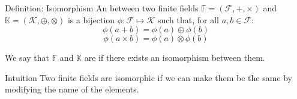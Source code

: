 \documentclass[a4paper]{article}
\begin{document}
\begin{parag}{Definition: Isomorphism}
    An  between two finite fields $\mathbb{F} = \left(\mathcal{F}, +, \times\right)$ and $\mathbb{K} = \left(\mathcal{K}, \oplus, \otimes\right)$ is a bijection $\phi : \mathcal{F} \mapsto \mathcal{K}$ such that, for all $a, b \in \mathcal{F}$: 
    \[\phi\left(a + b\right) = \phi\left(a\right) \oplus \phi\left(b\right)\]
    \[\phi\left(a \times b\right) = \phi\left(a\right) \otimes \phi\left(b\right)\]

    We say that $\mathbb{F}$ and $\mathbb{K}$ are  if there exists an isomorphism between them.

    \begin{subparag}{Intuition}
        Two finite fields are isomorphic if we can make them be the same by modifying the name of the elements.
    \end{subparag}
\end{parag}
\end{document}
